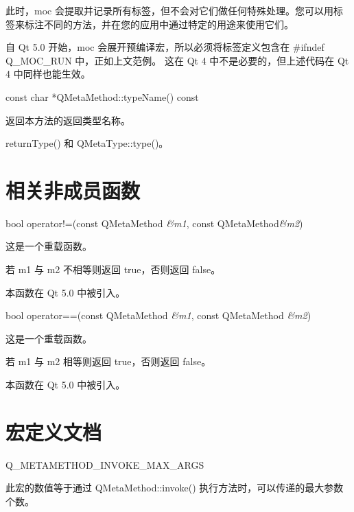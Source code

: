 此时，moc 会提取并记录所有标签，但不会对它们做任何特殊处理。您可以用标签来标注不同的方法，并在您的应用中通过特定的用途来使用它们。

\begin{notice}
自 Qt 5.0 开始，moc 会展开预编译宏，所以必须将标签定义包含在 \#ifndef Q\_MOC\_RUN 中，正如上文范例。
这在 Qt 4 中不是必要的，但上述代码在 Qt 4 中同样也能生效。
\end{notice}

const char *QMetaMethod::typeName() const

返回本方法的返回类型名称。

\begin{seeAlso}
returnType() 和 QMetaType::type()。
\end{seeAlso}

\section{相关非成员函数}

bool operator!=(const QMetaMethod \emph{\&m1}, const QMetaMethod\emph{\&m2})

这是一个重载函数。

若 m1 与 m2 不相等则返回 true，否则返回 false。

本函数在 Qt 5.0 中被引入。

bool operator==(const QMetaMethod \emph{\&m1}, const QMetaMethod \emph{\&m2})

这是一个重载函数。

若 m1 与 m2 相等则返回 true，否则返回 false。

本函数在 Qt 5.0 中被引入。

\section{宏定义文档}

Q\_METAMETHOD\_INVOKE\_MAX\_ARGS

此宏的数值等于通过 QMetaMethod::invoke() 执行方法时，可以传递的最大参数个数。